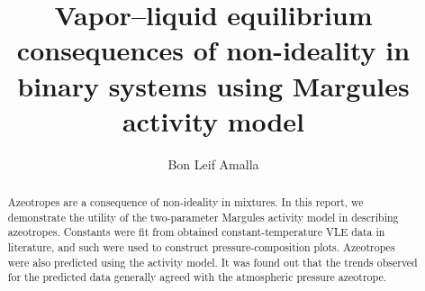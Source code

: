 \documentclass[11pt]{article}
\title{Vapor--liquid equilibrium consequences of non-ideality in binary systems
using Margules activity model}
\author{Bon Leif Amalla}
\begin{document}
    \maketitle

    \begin{abstract}
        Azeotropes are a consequence of non-ideality in mixtures. In this report,
        we demonstrate the utility of the two-parameter Margules
        activity model in describing azeotropes. Constants were fit from obtained
        constant-temperature VLE data in literature, and such were used to construct
        pressure-composition plots. Azeotropes were also predicted using the activity
        model. It was found out that the trends observed for the predicted data
        generally agreed with the atmospheric pressure azeotrope.
    \end{abstract}

    
    
    
    

    
    
\end{document}
